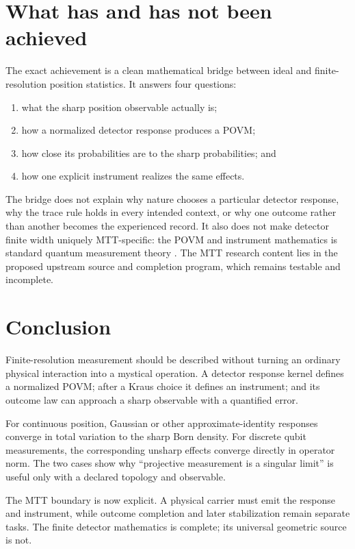 \documentclass[11pt]{article}
\begin{document}
\section{What has and has not been achieved}

The exact achievement is a clean mathematical bridge between ideal and
finite-resolution position statistics. It answers four questions:
\begin{enumerate}
\item what the sharp position observable actually is;
\item how a normalized detector response produces a POVM;
\item how close its probabilities are to the sharp probabilities; and
\item how one explicit instrument realizes the same effects.
\end{enumerate}

The bridge does not explain why nature chooses a particular detector
response, why the trace rule holds in every intended context, or why one
outcome rather than another becomes the experienced record. It also does not
make detector finite width uniquely MTT-specific: the POVM and instrument
mathematics is standard quantum measurement theory
\cite{DaviesLewis1970,Holevo2001}. The MTT research content lies in the
proposed upstream source and completion program, which remains testable and
incomplete.

\section{Conclusion}

Finite-resolution measurement should be described without turning an
ordinary physical interaction into a mystical operation. A detector response
kernel defines a normalized POVM; after a Kraus choice it defines an
instrument; and its outcome law can approach a sharp observable with a
quantified error.

For continuous position, Gaussian or other approximate-identity responses
converge in total variation to the sharp Born density. For discrete qubit
measurements, the corresponding unsharp effects converge directly in operator
norm. The two cases show why ``projective measurement is a singular limit''
is useful only with a declared topology and observable.

The MTT boundary is now explicit. A physical carrier must emit the response
and instrument, while outcome completion and later stabilization remain
separate tasks. The finite detector mathematics is complete; its universal
geometric source is not.
\end{document}
